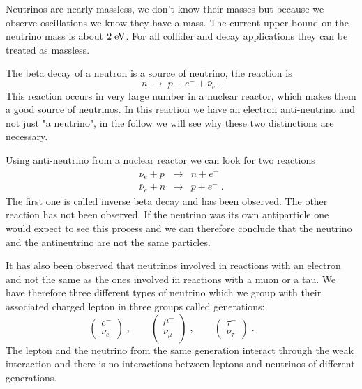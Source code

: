 \documentclass[12pt]{article}
\begin{document}
Neutrinos are nearly massless, we don't know their masses but because we observe oscillations we know they have a mass. The current upper bound on the neutrino mass is about $2\;{\rm eV}$. For all collider and decay applications they can be treated as massless. 

The beta decay of a neutron is a source of neutrino, the reaction is
\[n\;\rightarrow\; p + e^-+\bar\nu_e\;.\]
This reaction occurs in very large number in a nuclear reactor, which makes them a good source of neutrinos. In this reaction we have an electron anti-neutrino and not just "a neutrino", in the follow we will see why these two distinctions are necessary. 

Using anti-neutrino from a nuclear reactor we can look for two reactions 
\begin{eqnarray*}
\bar\nu_e +p &\rightarrow& n+e^+\\
\bar\nu_e +n &\rightarrow& p+e^-\;.
\end{eqnarray*}
The first one is called inverse beta decay and has been observed. The other reaction has not been observed. If the neutrino was its own antiparticle one would expect to see this process and we can therefore conclude that the neutrino and the antineutrino are not the same particles. 
 
It has also been observed that neutrinos involved in reactions with an electron and not the same as the ones involved in reactions with a muon or a tau. We have therefore three different types of neutrino which we group with their associated charged lepton in three groups called generations:
\[
\left(\begin{array}{c}e^-\\ \nu_e \end{array}\right)\;,\qquad
\left(\begin{array}{c}\mu^-\\ \nu_\mu \end{array}\right)\;,\qquad
\left(\begin{array}{c}\tau^-\\ \nu_\tau \end{array}\right)\;.\qquad
\]  
The lepton and the neutrino from the same generation interact through the weak interaction and there is no interactions between leptons and neutrinos of different generations. 
\end{document}
